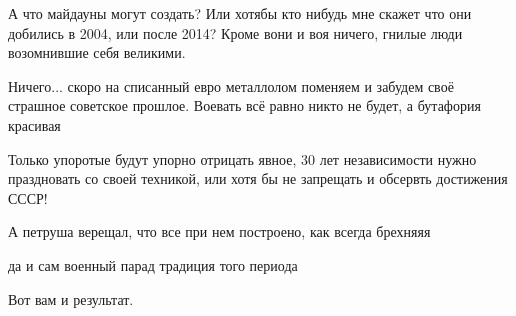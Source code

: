 \begin{itemize}
А что майдауны могут создать? Или хотябы кто нибудь мне скажет что они добились
в 2004, или после 2014? Кроме вони и воя ничего, гнилые люди возомнившие себя
великими.


 

Ничего... скоро на списанный евро металлолом поменяем и забудем своё страшное
советское прошлое.  Воевать всё равно никто не будет, а бутафория красивая


 

Только упоротые будут упорно отрицать явное, 30 лет независимости нужно
праздновать со своей техникой, или хотя бы не запрещать и обсервть достижения
СССР!


 
А петруша верещал, что все при нем построено, как всегда брехняяя

 
да и сам военный парад традиция того периода

 
Вот вам и результат.

 

\end{itemize}
